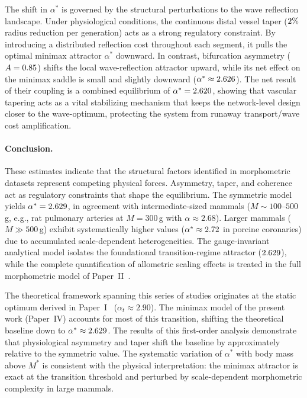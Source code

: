 \documentclass[11pt,a4paper]{article}
\theoremstyle{remark}
\begin{document}
The shift in $\alpha^*$ is governed by the structural perturbations to the wave
reflection landscape. Under physiological conditions, the continuous distal
vessel taper ($2\%$ radius reduction per generation) acts
as a strong regulatory constraint. By introducing a distributed reflection cost
throughout each segment, it pulls the optimal minimax attractor $\alpha^*$
downward. In contrast, bifurcation asymmetry ($A=0.85$)
shifts the local wave-reflection attractor upward, while its net effect on
the minimax saddle is small and slightly downward ($\alpha^* \approx
2.626$). The net result of their coupling is a combined
equilibrium of $\alpha^* = 2.620$, showing that vascular
tapering acts as a vital stabilizing mechanism that keeps the network-level
design closer to the wave-optimum, protecting the system from runaway
transport/wave cost amplification.

\paragraph{Conclusion.}
These estimates indicate that the structural factors identified in morphometric
datasets represent competing physical forces. Asymmetry, taper, and coherence
act as regulatory constraints that shape the equilibrium. The symmetric model
yields $\alpha^* = 2.629$, in agreement with intermediate-sized
mammals ($M \sim 100\text{--}500\,$g, e.g., rat pulmonary arteries at $M=300\,$g
with $\alpha \approx 2.68$). Larger mammals ($M \gg 500\,$g) exhibit
systematically higher values ($\alpha^* \approx 2.72$ in porcine
coronaries) due to accumulated scale-dependent heterogeneities. The
gauge-invariant analytical model isolates the foundational transition-regime
attractor ($2.629$), while the complete quantification of
allometric scaling effects is treated in the full morphometric model of
Paper~II~\cite{paperII}.

The theoretical framework spanning this series of studies originates at the
static optimum derived in Paper~I~\cite{paperI} ($\alpha_t \approx 2.90$). The
minimax model of the present work (Paper~IV) accounts for most of this
transition, shifting the theoretical baseline down to $\alpha^* \approx
2.629$. The results of this first-order analysis demonstrate that
physiological asymmetry and taper shift the baseline by approximately
\VarAlphaHeteroCombinedShift{} relative to the symmetric value. The systematic
variation of $\alpha^*$ with body mass above $M^*$ is consistent with the
physical interpretation: the minimax attractor is exact at the transition
threshold and perturbed by scale-dependent morphometric complexity in large
mammals.
\end{document}
